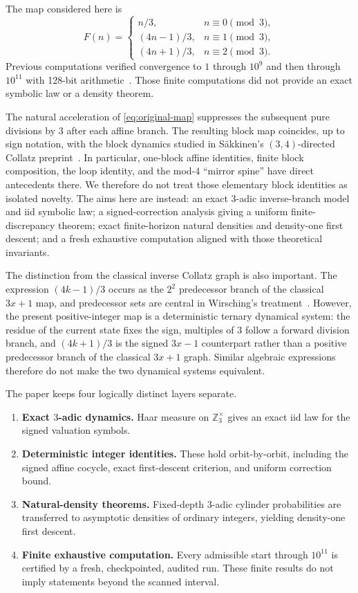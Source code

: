 \documentclass[11pt]{article}
\theoremstyle{definition}
\theoremstyle{remark}
\begin{document}
The map considered here is
\begin{equation}
F(n)=
\begin{cases}
 n/3, & n\equiv0\pmod3,\\
 (4n-1)/3, & n\equiv1\pmod3,\\
 (4n+1)/3, & n\equiv2\pmod3.
\end{cases}
\label{eq:original-map}
\end{equation}
Previous computations verified convergence to $1$ through $10^9$ and then through $10^{11}$ with 128-bit arithmetic~\cite{banazadeh-base,banazadeh-1e11}.  Those finite computations did not provide an exact symbolic law or a density theorem.

The natural acceleration of \eqref{eq:original-map} suppresses the subsequent pure divisions by $3$ after each affine branch.  The resulting block map coincides, up to sign notation, with the block dynamics studied in Säkkinen's $(3,4)$-directed Collatz preprint~\cite{sakkinen2025}.  In particular, one-block affine identities, finite block composition, the loop identity, and the mod-$4$ ``mirror spine'' have direct antecedents there.  We therefore do not treat those elementary block identities as isolated novelty.  The aims here are instead: an exact $3$-adic inverse-branch model and iid symbolic law; a signed-correction analysis giving a uniform finite-discrepancy theorem; exact finite-horizon natural densities and density-one first descent; and a fresh exhaustive computation aligned with those theoretical invariants.

The distinction from the classical inverse Collatz graph is also important.  The expression $(4k-1)/3$ occurs as the $2^2$ predecessor branch of the classical $3x+1$ map, and predecessor sets are central in Wirsching's treatment~\cite{wirsching1998}.  However, the present positive-integer map is a deterministic ternary dynamical system: the residue of the current state fixes the sign, multiples of $3$ follow a forward division branch, and $(4k+1)/3$ is the signed $3x-1$ counterpart rather than a positive predecessor branch of the classical $3x+1$ graph.  Similar algebraic expressions therefore do not make the two dynamical systems equivalent.

The paper keeps four logically distinct layers separate.
\begin{enumerate}[leftmargin=2.2em]
\item \textbf{Exact $3$-adic dynamics.} Haar measure on $\mathbb Z_3^\times$ gives an exact iid law for the signed valuation symbols.
\item \textbf{Deterministic integer identities.} These hold orbit-by-orbit, including the signed affine cocycle, exact first-descent criterion, and uniform correction bound.
\item \textbf{Natural-density theorems.} Fixed-depth $3$-adic cylinder probabilities are transferred to asymptotic densities of ordinary integers, yielding density-one first descent.
\item \textbf{Finite exhaustive computation.} Every admissible start through $10^{11}$ is certified by a fresh, checkpointed, audited run.  These finite results do not imply statements beyond the scanned interval.
\end{enumerate}
\end{document}
